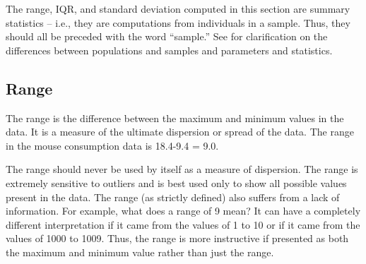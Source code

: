 \documentclass[10pt,openany]{book}\usepackage[]{graphicx}\usepackage[]{color}
\begin{document}
The range, IQR, and standard deviation computed in this section are summary statistics -- i.e., they are computations from individuals in a sample.  Thus, they should all be preceded with the word ``sample.''  See  for clarification on the differences between populations and samples and parameters and statistics.


\vspace{-12pt}

\subsection{Range}
The range is the difference between the maximum and minimum values in the data.  It is a measure of the ultimate dispersion or spread of the data.  The range in the mouse consumption data  is 18.4-9.4 = 9.0.

The range should never be used by itself as a measure of dispersion.  The range is extremely sensitive to outliers and is best used only to show all possible values present in the data.  The range (as strictly defined) also suffers from a lack of information.  For example, what does a range of 9 mean?  It can have a completely different interpretation if it came from the values of 1 to 10 or if it came from the values of 1000 to 1009.  Thus, the range is more instructive if presented as both the maximum and minimum value rather than just the range.


\vspace{-12pt}
\end{document}
